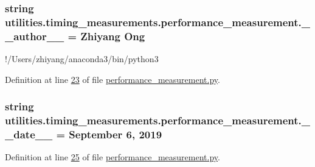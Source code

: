 \subsubsection[{\+\_\+\+\_\+author\+\_\+\+\_\+}]{\setlength{\rightskip}{0pt plus 5cm}string utilities.\+timing\+\_\+measurements.\+performance\+\_\+measurement.\+\_\+\+\_\+author\+\_\+\+\_\+ = \textquotesingle{}Zhiyang Ong\textquotesingle{}}\label{namespaceutilities_1_1timing__measurements_1_1performance__measurement_ae9ebc6598ae207bada8114a41262cd98}


!/\+Users/zhiyang/anaconda3/bin/python3 



Definition at line \hyperlink{performance__measurement_8py_source_l00023}{23} of file \hyperlink{performance__measurement_8py_source}{performance\+\_\+measurement.\+py}.

\hypertarget{namespaceutilities_1_1timing__measurements_1_1performance__measurement_a7d7385628a9772dfe4b0d7ff51942c6a}{}
\subsubsection[{\+\_\+\+\_\+date\+\_\+\+\_\+}]{\setlength{\rightskip}{0pt plus 5cm}string utilities.\+timing\+\_\+measurements.\+performance\+\_\+measurement.\+\_\+\+\_\+date\+\_\+\+\_\+ = \textquotesingle{}September 6, 2019\textquotesingle{}}\label{namespaceutilities_1_1timing__measurements_1_1performance__measurement_a7d7385628a9772dfe4b0d7ff51942c6a}


Definition at line \hyperlink{performance__measurement_8py_source_l00025}{25} of file \hyperlink{performance__measurement_8py_source}{performance\+\_\+measurement.\+py}.

\hypertarget{namespaceutilities_1_1timing__measurements_1_1performance__measurement_acaa159634d0efe832d19c3272a52ee1f}{}
